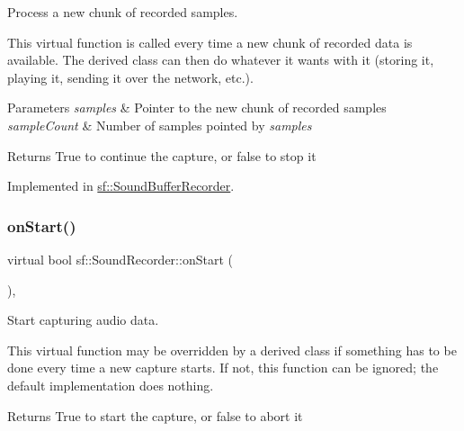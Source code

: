 Process a new chunk of recorded samples. 

This virtual function is called every time a new chunk of recorded data is available. The derived class can then do whatever it wants with it (storing it, playing it, sending it over the network, etc.).


\begin{DoxyParams}{Parameters}
{\em samples} & Pointer to the new chunk of recorded samples \\
\hline
{\em sample\+Count} & Number of samples pointed by {\itshape samples} \\
\hline
\end{DoxyParams}
\begin{DoxyReturn}{Returns}
True to continue the capture, or false to stop it \begin{DoxyVerb}\end{DoxyVerb}
 
\end{DoxyReturn}


Implemented in \mbox{\hyperlink{classsf_1_1_sound_buffer_recorder_a9ceb94de14632ae8c1b78faf603b4767}{sf\+::\+Sound\+Buffer\+Recorder}}.

\mbox{\label{classsf_1_1_sound_recorder_a7af418fb036201d3f85745bef78ce77f}} 
\subsubsection{\texorpdfstring{onStart()}{onStart()}}
{\footnotesize\ttfamily virtual bool sf\+::\+Sound\+Recorder\+::on\+Start (\begin{DoxyParamCaption}{ }\end{DoxyParamCaption})\hspace{0.3cm}{\ttfamily [protected]}, {\ttfamily [virtual]}}



Start capturing audio data. 

This virtual function may be overridden by a derived class if something has to be done every time a new capture starts. If not, this function can be ignored; the default implementation does nothing.

\begin{DoxyReturn}{Returns}
True to start the capture, or false to abort it \begin{DoxyVerb}\end{DoxyVerb}
 
\end{DoxyReturn}


